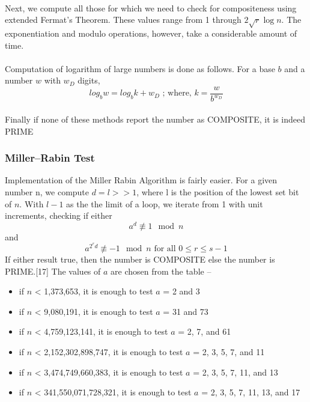\documentclass[paper=a4, fontsize=11pt]{scrartcl}	%
\numberwithin{equation}{section}		%
\numberwithin{figure}{section}		%
\numberwithin{table}{section}		%
\begin{document}
\paragraph{}Next, we compute all those for which we need to check for compositeness using extended Fermat's Theorem. These values range from 1 through $2\sqrt{r}\log n$. The exponentiation and modulo operations, however, take a considerable amount of time.

\paragraph{}Computation of logarithm of large numbers is done as follows. For a base $b$ and a number $w$ with $w_D$ digits, \[log_b w = log_b k + w_D \text{ ; where, } k = \frac{w}{b^{w_D}}\]

\paragraph{}Finally if none of these methods report the number as COMPOSITE, it is indeed PRIME

\subsubsection{Miller--Rabin Test}
Implementation of the Miller Rabin Algorithm is fairly easier. For a given number n, we compute $d = l >> 1$, where l is the position of the lowest set bit of $n$. With $l-1$ as the the limit of a loop, we iterate from 1 with unit increments, checking if either \[a^d \not\equiv 1 \mod n\] and \[a^{2^rd} \not\equiv -1 \mod n \text{	 for all } 0 \leq r \leq s-1\]If either result true, then the number is COMPOSITE else the number is PRIME.[17] The values of $a$ are chosen from the table -- 

\begin{itemize}
\item if $n$ < 1,373,653, it is enough to test $a$ = 2 and 3
\item if $n$ < 9,080,191, it is enough to test $a$ = 31 and 73
\item if $n$ < 4,759,123,141, it is enough to test $a$ = 2, 7, and 61
\item if $n$ < 2,152,302,898,747, it is enough to test $a$ = 2, 3, 5, 7, and 11
\item if $n$ < 3,474,749,660,383, it is enough to test $a$ = 2, 3, 5, 7, 11, and 13
\item if $n$ < 341,550,071,728,321, it is enough to test $a$ = 2, 3, 5, 7, 11, 13, and 17
\end{itemize}
\end{document}
